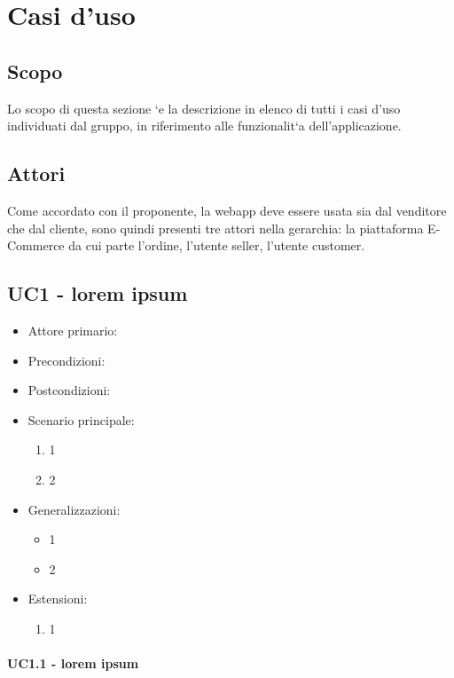 \section{Casi d'uso}

\subsection{Scopo}
Lo scopo di questa sezione `e la descrizione in elenco di tutti i casi d’uso individuati dal gruppo, in
riferimento alle funzionalit`a dell’applicazione.

\subsection{Attori}
Come accordato con il proponente, la webapp deve essere usata sia dal venditore che dal cliente,
sono quindi presenti tre attori nella gerarchia: la piattaforma E-Commerce da cui parte l'ordine, l'utente seller, l'utente customer.

\subsection{UC1 - lorem ipsum}

\begin{itemize}
    \item Attore primario:
    \item Precondizioni:
    \item Postcondizioni:
    \item Scenario principale: \begin{enumerate}
        \item 1
        \item 2
    \end{enumerate}
    \item Generalizzazioni: \begin{itemize}
        \item 1
        \item 2
    \end{itemize}
    \item Estensioni: \begin{enumerate}
        \item 1
    \end{enumerate}
\end{itemize}

\paragraph{UC1.1 - lorem ipsum}

